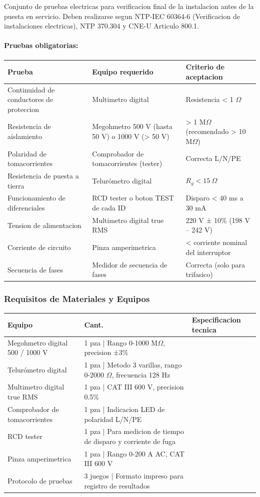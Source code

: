 Conjunto de pruebas electricas para verificacion final de la instalacion antes de la puesta en servicio. Deben realizarse segun NTP-IEC 60364-6 (Verificacion de instalaciones electricas), NTP 370.304 y CNE-U Articulo 800.1.

\paragraph{Pruebas obligatorias:}

\begin{longtable}{L{5.0cm} L{5.0cm} L{4.5cm}}
\toprule
\textbf{Prueba} & \textbf{Equipo requerido} & \textbf{Criterio de aceptacion} \\
\midrule
Continuidad de conductores de proteccion & Multimetro digital & Resistencia < 1 $\Omega$ \\
Resistencia de aislamiento & Megohmetro 500 V (hasta 50 V) o 1000 V (> 50 V) & > 1 M$\Omega$ (recomendado > 10 M$\Omega$) \\
Polaridad de tomacorrientes & Comprobador de tomacorrientes (tester) & Correcta L/N/PE \\
Resistencia de puesta a tierra & Telurómetro digital & $R_g < 15\ \Omega$ \\
Funcionamiento de diferenciales & RCD tester o boton TEST de cada ID & Disparo < 40 ms a 30 mA \\
Tension de alimentacion & Multimetro digital true RMS & 220 V ± 10\% (198 V -- 242 V) \\
Corriente de circuito & Pinza amperimetrica & < corriente nominal del interruptor \\
Secuencia de fases & Medidor de secuencia de fases & Correcta (solo para trifasico) \\
\bottomrule
\end{longtable}

\subsubsection{Requisitos de Materiales y Equipos}

\begin{longtable}{L{5.0cm} L{2.0cm} L{7.5cm}}
\toprule
\textbf{Equipo} & \textbf{Cant.} & \textbf{Especificacion tecnica} \\
\midrule
Megohmetro digital 500 / 1000 V & 1 pza | Rango 0-1000 M$\Omega$, precision ±3\% \\
Telurómetro digital & 1 pza | Metodo 3 varillas, rango 0-2000 $\Omega$, frecuencia 128 Hz \\
Multimetro digital true RMS & 1 pza | CAT III 600 V, precision 0.5\% \\
Comprobador de tomacorrientes & 1 pza | Indicacion LED de polaridad L/N/PE \\
RCD tester & 1 pza | Para medicion de tiempo de disparo y corriente de fuga \\
Pinza amperimetrica & 1 pza | Rango 0-200 A AC, CAT III 600 V \\
Protocolo de pruebas & 3 juegos | Formato impreso para registro de resultados \\
\bottomrule
\end{longtable}

